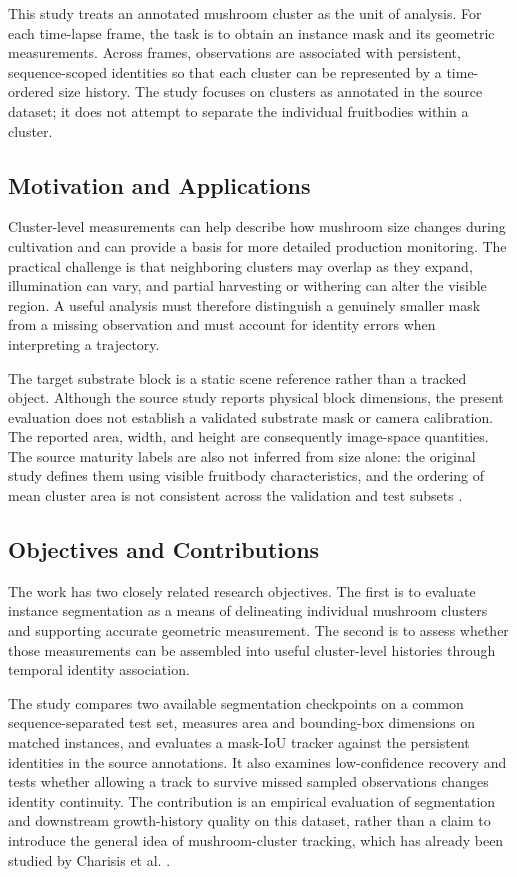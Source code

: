 \documentclass[11pt,a4paper]{article}
\begin{document}
This study treats an annotated mushroom cluster as the unit of analysis. For each time-lapse frame, the task is to obtain an instance mask and its geometric measurements. Across frames, observations are associated with persistent, sequence-scoped identities so that each cluster can be represented by a time-ordered size history. The study focuses on clusters as annotated in the source dataset; it does not attempt to separate the individual fruitbodies within a cluster.

\subsection{Motivation and Applications}

Cluster-level measurements can help describe how mushroom size changes during cultivation and can provide a basis for more detailed production monitoring. The practical challenge is that neighboring clusters may overlap as they expand, illumination can vary, and partial harvesting or withering can alter the visible region. A useful analysis must therefore distinguish a genuinely smaller mask from a missing observation and must account for identity errors when interpreting a trajectory.

The target substrate block is a static scene reference rather than a tracked object. Although the source study reports physical block dimensions, the present evaluation does not establish a validated substrate mask or camera calibration. The reported area, width, and height are consequently image-space quantities. The source maturity labels are also not inferred from size alone: the original study defines them using visible fruitbody characteristics, and the ordering of mean cluster area is not consistent across the validation and test subsets \cite{charisis}.

\subsection{Objectives and Contributions}

The work has two closely related research objectives. The first is to evaluate instance segmentation as a means of delineating individual mushroom clusters and supporting accurate geometric measurement. The second is to assess whether those measurements can be assembled into useful cluster-level histories through temporal identity association.

The study compares two available segmentation checkpoints on a common sequence-separated test set, measures area and bounding-box dimensions on matched instances, and evaluates a mask-IoU tracker against the persistent identities in the source annotations. It also examines low-confidence recovery and tests whether allowing a track to survive missed sampled observations changes identity continuity. The contribution is an empirical evaluation of segmentation and downstream growth-history quality on this dataset, rather than a claim to introduce the general idea of mushroom-cluster tracking, which has already been studied by Charisis et al. \cite{charisis}.
\end{document}
